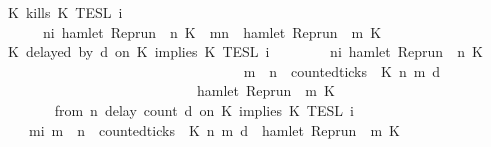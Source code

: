 \begin{isabellebody}
{\isacharbar}\ {\isacartoucheopen}{\isasymlbrakk}\ K\ kills\ K\ {\isasymrbrakk}\isactrlsub T\isactrlsub E\isactrlsub S\isactrlsub L\isactrlbsup {\isasymge}\ i\isactrlesup \ {\isacharequal}\isanewline
\ \ \ \ \ \ {\isacharbraceleft}{\isasymrho}{\isachardot}\ {\isasymforall}n{\isasymge}i{\isachardot}\ hamlet\ {\isacharparenleft}{\isacharparenleft}Rep{\isacharunderscore}run\ {\isasymrho}{\isacharparenright}\ n\ K\ {\isasymlongrightarrow}\ {\isacharparenleft}{\isasymforall}m{\isasymge}n{\isachardot}\ {\isasymnot}\ hamlet\ {\isacharparenleft}{\isacharparenleft}Rep{\isacharunderscore}run\ {\isasymrho}{\isacharparenright}\ m\ K\isanewline
{\isacharbar}\ {\isacartoucheopen}{\isasymlbrakk}\ K{}\ delayed\ by\ d\ on\ K{}\ implies\ K{}\ {\isasymrbrakk}\isactrlsub T\isactrlsub E\isactrlsub S\isactrlsub L\isactrlbsup {\isasymge}\ i\isactrlesup \ {\isacharequal}\isanewline
\ \ \ \ \ \ {\isacharbraceleft}{\isasymrho}{\isachardot}\ {\isasymforall}n{\isasymge}i{\isachardot}\ hamlet\ {\isacharparenleft}{\isacharparenleft}Rep{\isacharunderscore}run\ {\isasymrho}{\isacharparenright}\ n\ K{}{\isacharparenright}\ {\isasymlongrightarrow}\isanewline
\ \ \ \ \ \ \ \ \ \ \ \ \ \ \ \ \ {\isacharparenleft}\isanewline
\ \ \ \ \ \ \ \ \ \ \ \ \ \ \ \ \ \ {\isasymforall}m\ {\isasymge}\ n{\isachardot}\ \ counted{\isacharunderscore}ticks\ {\isasymrho}\ K{}\ n\ m\ d\isanewline
\ \ \ \ \ \ \ \ \ \ \ \ \ \ \ \ \ \ \ \ \ \ \ \ \ \ \ \ {\isasymlongrightarrow}\ hamlet\ {\isacharparenleft}{\isacharparenleft}Rep{\isacharunderscore}run\ {\isasymrho}{\isacharparenright}\ m\ K{}{\isacharparenright}\isanewline
\ \ \ \ \ \ \ \ \ \ \ \ \ \ \ \ \ {\isacharparenright}\isanewline
\ \ \ \ \ \ {\isacharbraceright}{\isacartoucheclose}\isanewline
{\isacharbar}\ {\isacartoucheopen}{\isasymlbrakk}\ from\ n\ delay\ count\ d\ on\ K{}\ implies\ K{}\ {\isasymrbrakk}\isactrlsub T\isactrlsub E\isactrlsub S\isactrlsub L\isactrlbsup {\isasymge}\ i\isactrlesup \ {\isacharequal}\isanewline
\ \ \ \ {\isacharbraceleft}{\isasymrho}{\isachardot}\ {\isasymforall}m{\isasymge}i{\isachardot}\ {\isacharparenleft}m\ {\isasymge}\ n\ {\isasymand}\ counted{\isacharunderscore}ticks\ {\isasymrho}\ K{}\ n\ m\ d{\isacharparenright}\ {\isasymlongrightarrow}\ hamlet\ {\isacharparenleft}{\isacharparenleft}Rep{\isacharunderscore}run\ {\isasymrho}{\isacharparenright}\ m\ K{}{\isacharparenright}{\isacharbraceright}\isanewline

\end{isabellebody}
